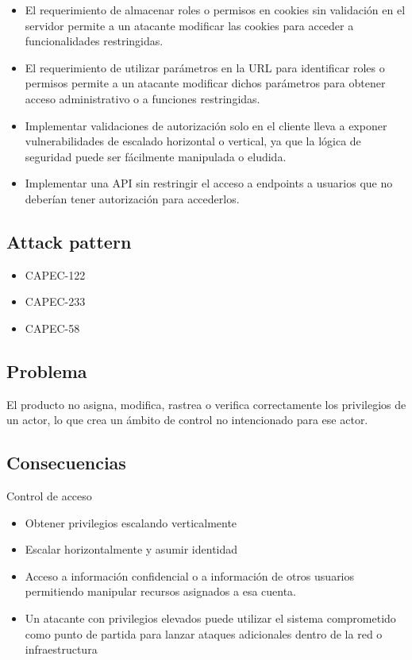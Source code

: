 \begin{itemize}
    \item El requerimiento de almacenar roles o permisos en cookies sin validación en el servidor permite a un atacante modificar las cookies para acceder a funcionalidades restringidas.
    \item El requerimiento de utilizar parámetros en la URL para identificar roles o permisos permite a un atacante modificar dichos parámetros para obtener acceso administrativo o a funciones restringidas.
    \item Implementar validaciones de autorización solo en el cliente lleva a exponer vulnerabilidades de escalado horizontal o vertical, ya que la lógica de seguridad puede ser fácilmente manipulada o eludida.
    \item Implementar una API sin restringir el acceso a endpoints a usuarios que no deberían tener autorización para accederlos.
\end{itemize}

\subsection*{Attack pattern}
\begin{itemize}
    \item CAPEC-122
    \item CAPEC-233
    \item CAPEC-58
\end{itemize}
\subsection*{Problema}
El producto no asigna, modifica, rastrea o verifica correctamente los privilegios de un actor, lo que crea un ámbito de control no intencionado para ese actor.
\subsection*{Consecuencias}
Control de acceso
\begin{itemize}
    \item Obtener privilegios escalando verticalmente
    \item Escalar horizontalmente y asumir identidad
    \item Acceso a información confidencial o a información de otros usuarios permitiendo manipular recursos asignados a esa cuenta.
    \item Un atacante con privilegios elevados puede utilizar el sistema comprometido como punto de partida para lanzar ataques adicionales dentro de la red o infraestructura
\end{itemize}


